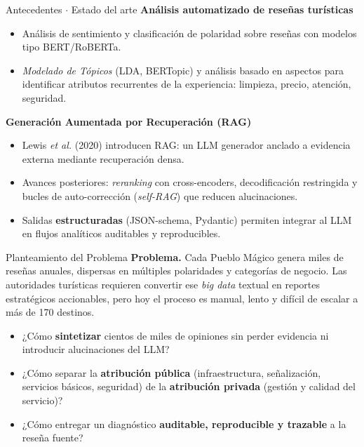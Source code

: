 \documentclass[10pt,aspectratio=169]{beamer}
\begin{document}
\begin{frame}{Antecedentes \(\cdot\) Estado del arte}
	\textbf{Análisis automatizado de reseñas turísticas}
	\begin{itemize}\setlength\itemsep{2pt}
		\item Análisis de sentimiento y clasificación de polaridad sobre reseñas
		      con modelos tipo BERT/RoBERTa.
		\item \emph{Modelado de Tópicos} (LDA, BERTopic) y análisis basado en aspectos
		      para identificar atributos recurrentes de la experiencia:
		      limpieza, precio, atención, seguridad.
	\end{itemize}

	\medskip
	\textbf{Generación Aumentada por Recuperación (RAG)}
	\begin{itemize}\setlength\itemsep{2pt}
		\item Lewis \emph{et al.} (2020) introducen RAG: un LLM generador anclado
		      a evidencia externa mediante recuperación densa.
		\item Avances posteriores: \emph{reranking} con cross-encoders,
		      decodificación restringida y bucles de auto-corrección
		      (\emph{self-RAG}) que reducen alucinaciones.
		\item Salidas \textbf{estructuradas} (JSON-schema, Pydantic) permiten
		      integrar al LLM en flujos analíticos auditables y reproducibles.
	\end{itemize}
\end{frame}

\begin{frame}{Planteamiento del Problema}
	\textbf{Problema.}
	Cada Pueblo Mágico genera miles de reseñas anuales, dispersas en
	múltiples polaridades y categorías de negocio. Las autoridades
	turísticas requieren convertir ese \emph{big data} textual en reportes estratégicos accionables, pero hoy el proceso es
	manual, lento y difícil de escalar a más de 170 destinos.

	\medskip
	\begin{itemize}\setlength\itemsep{3pt}
		\item ¿Cómo \textbf{sintetizar} cientos de miles de opiniones sin perder
		      evidencia ni introducir alucinaciones del LLM?
		\item ¿Cómo separar la \textbf{atribución pública} (infraestructura,
		      señalización, servicios básicos, seguridad) de la
		      \textbf{atribución privada} (gestión y calidad del servicio)?
		\item ¿Cómo entregar un diagnóstico
		      \textbf{auditable, reproducible y trazable} a la reseña fuente?
	\end{itemize}
\end{frame}
\end{document}
